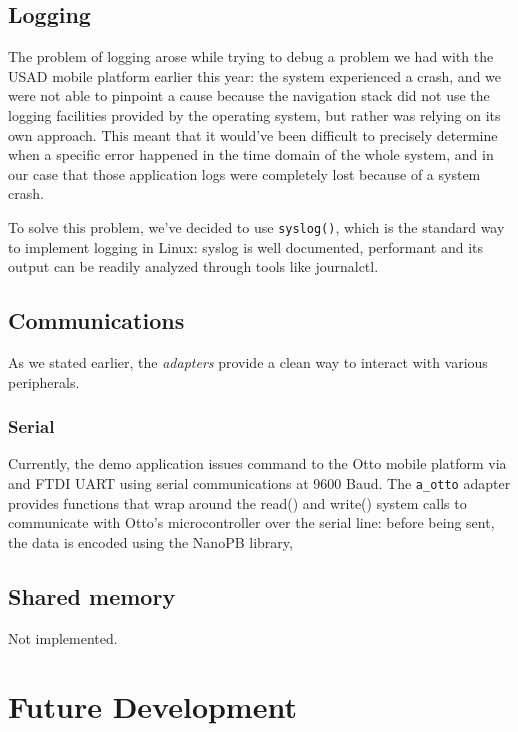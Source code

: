 \documentclass[a4paper,12pt]{report}
\begin{document}
\subsection{Logging}

The problem of logging arose while trying to debug a problem we had with the USAD mobile platform earlier this year: the system experienced a crash, and we were not able to pinpoint a cause because the navigation stack did not use the logging facilities provided by the operating system, but rather was relying on its own approach. This meant that it would've been difficult to precisely determine when a specific error happened in the time domain of the whole system, and in our case that those application logs were completely lost because of a system crash.

To solve this problem, we've decided to use \texttt{syslog()}, which is the standard way to implement logging in Linux: syslog is well documented, performant and its output can be readily analyzed through tools like journalctl.

\subsection{Communications}

As we stated earlier, the \textit{adapters} provide a clean way to interact with various peripherals.

\subsubsection{Serial}

Currently, the demo application issues command to the Otto mobile platform via and FTDI UART using serial communications at 9600 Baud. The \texttt{a\_otto} adapter provides functions that wrap around the read() and write() system calls to communicate with Otto's microcontroller over the serial line: before being sent, the data is encoded using the NanoPB library,  

\subsection{Shared memory}

Not implemented.

\section{Future Development}
\end{document}
